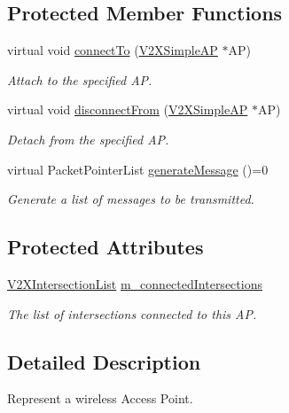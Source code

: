 \subsection*{Protected Member Functions}
\begin{DoxyCompactItemize}
\item 
virtual void \hyperlink{classV2XSimpleAP_aa3fa97ad5234a7e49bada9f514fb9d35}{connect\+To} (\hyperlink{classV2XSimpleAP}{V2\+X\+Simple\+AP} $\ast$AP)
\begin{DoxyCompactList}\small\item\em Attach to the specified AP. \end{DoxyCompactList}\item 
virtual void \hyperlink{classV2XSimpleAP_a01300f7a6bf2d711f17b581aaa7a64d3}{disconnect\+From} (\hyperlink{classV2XSimpleAP}{V2\+X\+Simple\+AP} $\ast$AP)
\begin{DoxyCompactList}\small\item\em Detach from the specified AP. \end{DoxyCompactList}\item 
virtual Packet\+Pointer\+List \hyperlink{classV2XSimpleAP_a7dd6286913001eb2554dee16693e8def}{generate\+Message} ()=0
\begin{DoxyCompactList}\small\item\em Generate a list of messages to be transmitted. \end{DoxyCompactList}\end{DoxyCompactItemize}
\subsection*{Protected Attributes}
\begin{DoxyCompactItemize}
\item 
\hyperlink{group__V2XFramework_ga22a1c07fac7df77efff8f0d4f6f3c248}{V2\+X\+Intersection\+List} \hyperlink{classV2XSimpleAP_a2dab85aaf75f11b08a044c171c010949}{m\+\_\+connected\+Intersections}\hypertarget{classV2XSimpleAP_a2dab85aaf75f11b08a044c171c010949}{}\label{classV2XSimpleAP_a2dab85aaf75f11b08a044c171c010949}

\begin{DoxyCompactList}\small\item\em The list of intersections connected to this AP. \end{DoxyCompactList}\end{DoxyCompactItemize}


\subsection{Detailed Description}
Represent a wireless Access Point. 

